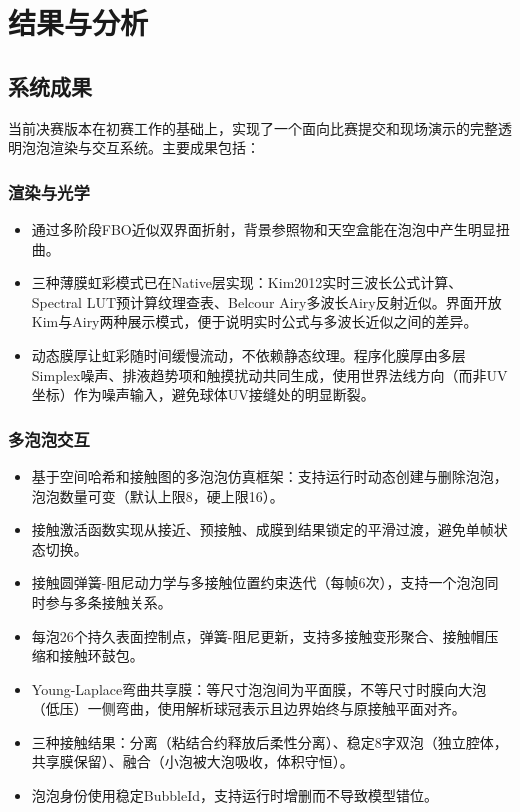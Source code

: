 
\chapter{结果与分析}

\section{系统成果}

当前决赛版本在初赛工作的基础上，实现了一个面向比赛提交和现场演示的完整透明泡泡渲染与交互系统。主要成果包括：

\subsection{渲染与光学}

\begin{itemize}
  \item 通过多阶段FBO近似双界面折射，背景参照物和天空盒能在泡泡中产生明显扭曲。
  \item 三种薄膜虹彩模式已在Native层实现：Kim2012实时三波长公式计算、Spectral LUT预计算纹理查表、Belcour Airy多波长Airy反射近似。界面开放Kim与Airy两种展示模式，便于说明实时公式与多波长近似之间的差异。
  \item 动态膜厚让虹彩随时间缓慢流动，不依赖静态纹理。程序化膜厚由多层Simplex噪声、排液趋势项和触摸扰动共同生成，使用世界法线方向（而非UV坐标）作为噪声输入，避免球体UV接缝处的明显断裂。
\end{itemize}

\subsection{多泡泡交互}

\begin{itemize}
  \item 基于空间哈希和接触图的多泡泡仿真框架：支持运行时动态创建与删除泡泡，泡泡数量可变（默认上限8，硬上限16）。
  \item 接触激活函数实现从接近、预接触、成膜到结果锁定的平滑过渡，避免单帧状态切换。
  \item 接触圆弹簧-阻尼动力学与多接触位置约束迭代（每帧6次），支持一个泡泡同时参与多条接触关系。
  \item 每泡26个持久表面控制点，弹簧-阻尼更新，支持多接触变形聚合、接触帽压缩和接触环鼓包。
  \item Young-Laplace弯曲共享膜：等尺寸泡泡间为平面膜，不等尺寸时膜向大泡（低压）一侧弯曲，使用解析球冠表示且边界始终与原接触平面对齐。
  \item 三种接触结果：分离（粘结合约释放后柔性分离）、稳定8字双泡（独立腔体，共享膜保留）、融合（小泡被大泡吸收，体积守恒）。
  \item 泡泡身份使用稳定BubbleId，支持运行时增删而不导致模型错位。
\end{itemize}


